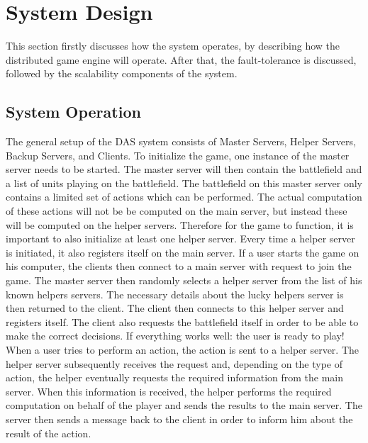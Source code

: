 \section{System Design}
This section firstly discusses how the system operates, by describing how the distributed game engine will operate.
After that, the fault-tolerance is discussed, followed by the scalability components of the system.

\subsection{System Operation}
The general setup of the DAS system consists of Master Servers, Helper Servers, Backup Servers, and Clients.
To initialize the game, one instance of the master server needs to be started. 
The master server will then contain the battlefield and a list of units playing on the battlefield.
The battlefield on this master server only contains a limited set of actions which can be performed.
The actual computation of these actions will not be be computed on the main server, but instead these will be computed on the helper servers.
Therefore for the game to function, it is important to also initialize at least one helper server. 
Every time a helper server is initiated, it also registers itself on the main server.
If a user starts the game on his computer, the clients then connect to a main server with request to join the game.
The master server then randomly selects a helper server from the list of his known helpers servers.
The necessary details about the lucky helpers server is then returned to the client. 
The client then connects to this helper server and registers itself.
The client also requests the battlefield itself in order to be able to make the correct decisions. 
If everything works well: the user is ready to play!
When a user tries to perform an action, the action is sent to a helper server.
The helper server subsequently receives the request and, depending on the type of action, the helper  eventually requests the required information from the main server.
When this information is received, the helper performs the required computation on behalf of the player and sends the results to the main server.
The server then sends a message back to the client in order to inform him about the result of the action.

